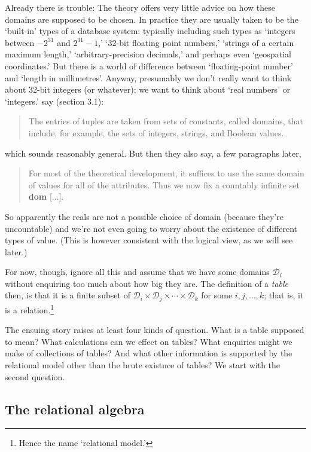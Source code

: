 \documentclass[10pt, a4paper, twocolumn]{article}
\begin{document}
Already there is trouble: The theory offers very little advice on how these
domains are supposed to be chosen. In practice they are usually taken to be the
`built-in' types of a database system: typically including such types as
`integers between $-2^{31}$ and $2^{31}-1$,' `32-bit floating point numbers,'
`strings of a certain maximum length,' `arbitrary-precision decimals,' and
perhaps even `geospatial coordinates.' But there is a world of difference
between `floating-point number' and `length in millimetres'. Anyway, presumably
we don't really want to think about 32-bit integers (or whatever): we want to
think about `real numbers' or `integers.' \textcite{abiteboul1995foundations}
say (section 3.1):
\begin{quote}
  The entries of tuples are taken from sets of constants, called domains, that
  include, for example, the sets of integers, strings, and Boolean values.
\end{quote}
which sounds reasonably general. But then they also say, a few paragraphs later,
\begin{quote}
  For most of the theoretical development, it suffices to use the same domain of
  values for all of the attributes. Thus we now fix a countably infinite set
  \textbf{dom} [...].
\end{quote}
So apparently the reals are not a possible choice of domain (because they're
uncountable) and we're not even going to worry about the existence of different
types of value. (This is however consistent with the logical view, as we will
see later.)

For now, though, ignore all this and assume that we have some domains
$\mathscr{D}_i$ without enquiring too much about how big they are. The
definition of a \emph{table} then, is that it is a finite subset of
$\mathscr{D}_i\times \mathscr{D}_j\times\dotsm\times\mathscr{D}_k$ for some $i, j, \dots, k$;
that is, it is a relation.\footnote{Hence the name `relational model.'}

The ensuing story raises at least four kinds of question. What is a table
supposed to mean? What calculations can we effect on tables? What enquiries
might we make of collections of tables? And what other information is supported
by the relational model other than the brute existnce of tables? We start with
the second question.

\subsection{The relational algebra}
\end{document}
